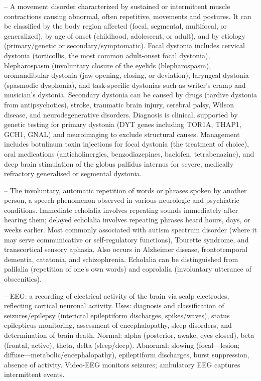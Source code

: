 -- A movement disorder characterized by sustained or intermittent muscle contractions causing abnormal, often repetitive, movements and postures. It can be classified by the body region affected (focal, segmental, multifocal, or generalized), by age of onset (childhood, adolescent, or adult), and by etiology (primary/genetic or secondary/symptomatic). Focal dystonia includes cervical dystonia (torticollis, the most common adult-onset focal dystonia), blepharospasm (involuntary closure of the eyelids (blepharospasm), oromandibular dystonia (jaw opening, closing, or deviation), laryngeal dystonia (spasmodic dysphonia), and task-specific dystonias such as writer's cramp and musician's dystonia. Secondary dystonia can be caused by drugs (tardive dystonia from antipsychotics), stroke, traumatic brain injury, cerebral palsy, Wilson disease, and neurodegenerative disorders. Diagnosis is clinical, supported by genetic testing for primary dystonia (DYT genes including TOR1A, THAP1, GCH1, GNAL) and neuroimaging to exclude structural causes. Management includes botulinum toxin injections for focal dystonia (the treatment of choice), oral medications (anticholinergics, benzodiazepines, baclofen, tetrabenazine), and deep brain stimulation of the globus pallidus internus for severe, medically refractory generalised or segmental dystonia.

-- The involuntary, automatic repetition of words or phrases spoken by another person, a speech phenomenon observed in various neurologic and psychiatric conditions. Immediate echolalia involves repeating sounds immediately after hearing them; delayed echolalia involves repeating phrases heard hours, days, or weeks earlier. Most commonly associated with autism spectrum disorder (where it may serve communicative or self-regulatory functions), Tourette syndrome, and transcortical sensory aphasia. Also occurs in Alzheimer disease, frontotemporal dementia, catatonia, and schizophrenia. Echolalia can be distinguished from palilalia (repetition of one's own words) and coprolalia (involuntary utterance of obscenities).

-- EEG: a recording of electrical activity of the brain via scalp electrodes, reflecting cortical neuronal activity. Uses: diagnosis and classification of seizures/epilepsy (interictal epileptiform discharges, spikes/waves), status epilepticus monitoring, assessment of encephalopathy, sleep disorders, and determination of brain death. Normal: alpha (posterior, awake, eyes closed), beta (frontal, active), theta, delta (sleep/deep). Abnormal: slowing (focal—lesion; diffuse—metabolic/encephalopathy), epileptiform discharges, burst suppression, absence of activity. Video-EEG monitors seizures; ambulatory EEG captures intermittent events.

